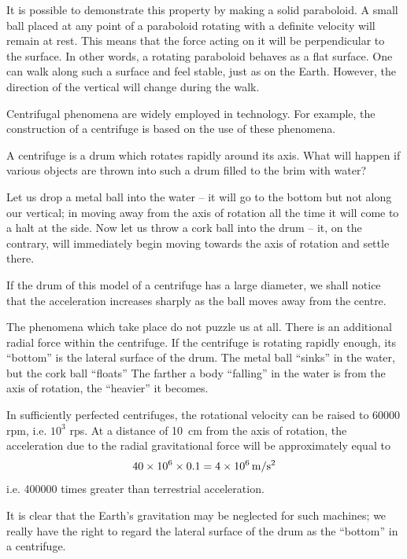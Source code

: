 It is possible to demonstrate this property by making
a solid paraboloid. A small ball placed at any point
of a paraboloid rotating with a definite velocity will
remain at rest. This means that the force acting on it
will be perpendicular to the surface. In other words, a
rotating paraboloid behaves as a flat surface. One can
walk along such a surface and feel stable, just as on the
Earth. However, the direction of the vertical will change
during the walk.


Centrifugal phenomena are widely employed in technology. For example, the construction of a centrifuge is based on the use of these phenomena.


A centrifuge is a drum which rotates rapidly around its
axis. What will happen if various objects are thrown into
such a drum filled to the brim with water?

Let us drop a metal ball into the water -- it will go to
the bottom but not along our vertical; in moving away
from the axis of rotation all the time it will come to
a halt at the side. Now let us throw a cork ball into the
drum -- it, on the contrary, will immediately begin
moving towards the axis of rotation and settle there.

If the drum of this model of a centrifuge has a large
diameter, we shall notice that the acceleration increases
sharply as the ball moves away from the centre.

The phenomena which take place do not puzzle us at
all. There is an additional radial force within the centrifuge. If the centrifuge is rotating rapidly enough, its
``bottom'' is the lateral surface of the drum. The metal
ball ``sinks'' in the water, but the cork ball ``floats'' The
farther a body ``falling'' in the water is from the axis of
rotation, the ``heavier'' it becomes.

In sufficiently perfected centrifuges, the rotational
velocity can be raised to \num{60000} rpm, i.e. $10^{3}$ rps. At
a distance of \SI{10}{\centi\meter} from the axis of rotation, the acceleration due to the radial gravitational force will be approximately equal to
\begin{equation*}
40 \times 10^{6} \times 0.1 = 4 \times \SI{d6}{\meter\per\second\squared}
\end{equation*}
i.e. \num{400000} times greater than terrestrial acceleration.

It is clear that the Earth's gravitation may be neglected for such machines; we really have the right to regard the lateral surface of the drum as the ``bottom'' in a centrifuge.

